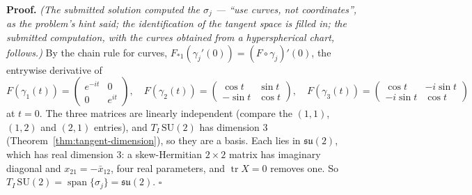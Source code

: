 \documentclass[11pt]{report}
\renewenvironment{proof}[1][Proof]{\noindent\textbf{#1.} }{\hfill$\square$\par\vspace{5pt}}
\DeclareMathOperator{\tr}{tr}
\DeclareMathOperator{\Span}{span}
\begin{document}
\begin{proof}
\textit{(The submitted solution computed the $\sigma_j$ --- ``use curves, not coordinates'', as the problem's hint said; the identification of the tangent space is filled in; the submitted computation, with the curves obtained from a hyperspherical chart, follows.)} By the chain rule for curves, $F_{*1}(\gamma_j'(0)) = (F \circ \gamma_j)'(0)$, the entrywise derivative of
\[
F(\gamma_1(t)) = \begin{pmatrix} e^{-it} & 0 \\ 0 & e^{it} \end{pmatrix}, \quad
F(\gamma_2(t)) = \begin{pmatrix} \cos t & \sin t \\ -\sin t & \cos t \end{pmatrix}, \quad
F(\gamma_3(t)) = \begin{pmatrix} \cos t & -i\sin t \\ -i\sin t & \cos t \end{pmatrix}
\]
at $t = 0$. The three matrices are linearly independent (compare the $(1,1)$, $(1,2)$ and $(2,1)$ entries), and $T_I\,\mathrm{SU}(2)$ has dimension $3$ (Theorem~\ref{thm:tangent-dimension}), so they are a basis. Each lies in $\mathfrak{su}(2)$, which has real dimension $3$: a skew-Hermitian $2 \times 2$ matrix has imaginary diagonal and $x_{21} = -\bar x_{12}$, four real parameters, and $\tr X = 0$ removes one. So $T_I\,\mathrm{SU}(2) = \Span\{\sigma_j\} = \mathfrak{su}(2)$.
\end{proof}
\end{document}
